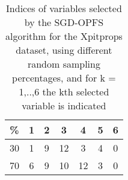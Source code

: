 \begin{table}
	\begin{center}
		\begin{tabular}{c c c c c c c}
			\% & 1 & 2 & 3 & 4 & 5 & 6 \\
			\hline
			30 & 1 & 9 & 12 & 3 & 4 & 0 \\
			70 & 6 & 9 & 10 & 12 & 3 & 0 \\
		\end{tabular}
	\end{center}
	\caption{Indices of variables selected by the SGD-OPFS algorithm for the Xpitprops dataset, using different random sampling percentages, and for k = 1,..,6 the kth selected variable is indicated}
\end{table}